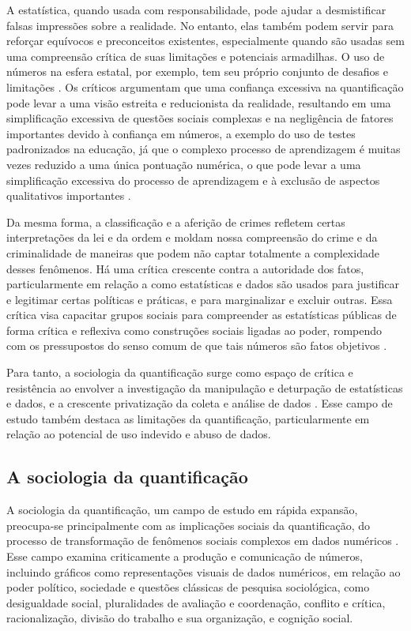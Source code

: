 A estatística, quando usada com responsabilidade, pode ajudar a desmistificar falsas impressões sobre a realidade. No entanto, elas também podem servir para reforçar equívocos e preconceitos existentes, especialmente quando são usadas sem uma compreensão crítica de suas limitações e potenciais armadilhas. O uso de números na esfera estatal, por exemplo, tem seu próprio conjunto de desafios e limitações \cite{sareen2020ethics}. Os críticos argumentam que uma confiança excessiva na quantificação pode levar a uma visão estreita e reducionista da realidade, resultando em uma simplificação excessiva de questões sociais complexas e na negligência de fatores importantes devido à confiança em números, a exemplo do uso de testes padronizados na educação, já que o complexo processo de aprendizagem é muitas vezes reduzido a uma única pontuação numérica, o que pode levar a uma simplificação excessiva do processo de aprendizagem e à exclusão de aspectos qualitativos importantes \cite{laevers1994innovative}.

Da mesma forma, a classificação e a aferição de crimes refletem certas interpretações da lei e da ordem e moldam nossa compreensão do crime e da criminalidade de maneiras que podem não captar totalmente a complexidade desses fenômenos. Há uma crítica crescente contra a autoridade dos fatos, particularmente em relação a como estatísticas e dados são usados para justificar e legitimar certas políticas e práticas, e para marginalizar e excluir outras. Essa crítica visa capacitar grupos sociais para compreender as estatísticas públicas de forma crítica e reflexiva como construções sociais ligadas ao poder, rompendo com os pressupostos do senso comum de que tais números são fatos objetivos \cite{sellar2018feel}.

Para tanto, a sociologia da quantificação surge como espaço de crítica e resistência ao envolver a investigação da manipulação e deturpação de estatísticas e dados, e a crescente privatização da coleta e análise de dados \cite{gillborn2018quantcrit}. Esse campo de estudo também destaca as limitações da quantificação, particularmente em relação ao potencial de uso indevido e abuso de dados.

\subsection{A sociologia da quantificação}

A sociologia da quantificação, um campo de estudo em rápida expansão, preocupa-se principalmente com as implicações sociais da quantificação, do processo de transformação de fenômenos sociais complexos em dados numéricos \cite{berman2018sociology}. Esse campo examina criticamente a produção e comunicação de números, incluindo gráficos como representações visuais de dados numéricos, em relação ao poder político, sociedade e questões clássicas de pesquisa sociológica, como desigualdade social, pluralidades de avaliação e coordenação, conflito e crítica, racionalização, divisão do trabalho e sua organização, e cognição social.

